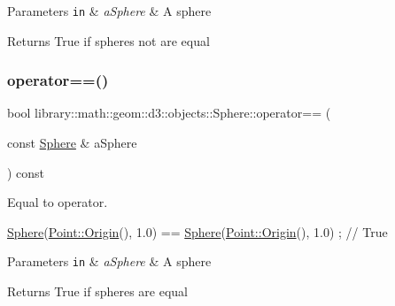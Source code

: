 \begin{DoxyParams}[1]{Parameters}
\mbox{\tt in}  & {\em a\+Sphere} & A sphere \\
\hline
\end{DoxyParams}
\begin{DoxyReturn}{Returns}
True if spheres not are equal 
\end{DoxyReturn}
\mbox{\label{classlibrary_1_1math_1_1geom_1_1d3_1_1objects_1_1_sphere_ace12dcb88802f002f5797077130c4b98}} 
\subsubsection{\texorpdfstring{operator==()}{operator==()}}
{\footnotesize\ttfamily bool library\+::math\+::geom\+::d3\+::objects\+::\+Sphere\+::operator== (\begin{DoxyParamCaption}\item[{const \hyperlink{classlibrary_1_1math_1_1geom_1_1d3_1_1objects_1_1_sphere}{Sphere} \&}]{a\+Sphere }\end{DoxyParamCaption}) const}



Equal to operator. 


\begin{DoxyCode}
\hyperlink{classlibrary_1_1math_1_1geom_1_1d3_1_1objects_1_1_sphere_a55dccc8ea16ee55cd7694c26afa8ea39}{Sphere}(\hyperlink{classlibrary_1_1math_1_1geom_1_1d3_1_1objects_1_1_point_ab2a38e285c562e50bf350272c083986f}{Point::Origin}(), 1.0) == \hyperlink{classlibrary_1_1math_1_1geom_1_1d3_1_1objects_1_1_sphere_a55dccc8ea16ee55cd7694c26afa8ea39}{Sphere}(\hyperlink{classlibrary_1_1math_1_1geom_1_1d3_1_1objects_1_1_point_ab2a38e285c562e50bf350272c083986f}{Point::Origin}(), 1.0) ; \textcolor{comment}{//
       True}
\end{DoxyCode}



\begin{DoxyParams}[1]{Parameters}
\mbox{\tt in}  & {\em a\+Sphere} & A sphere \\
\hline
\end{DoxyParams}
\begin{DoxyReturn}{Returns}
True if spheres are equal 
\end{DoxyReturn}
\mbox{\label{classlibrary_1_1math_1_1geom_1_1d3_1_1objects_1_1_sphere_a6eb8a0a7e27bf24d3f1101a6700f5247}} 
